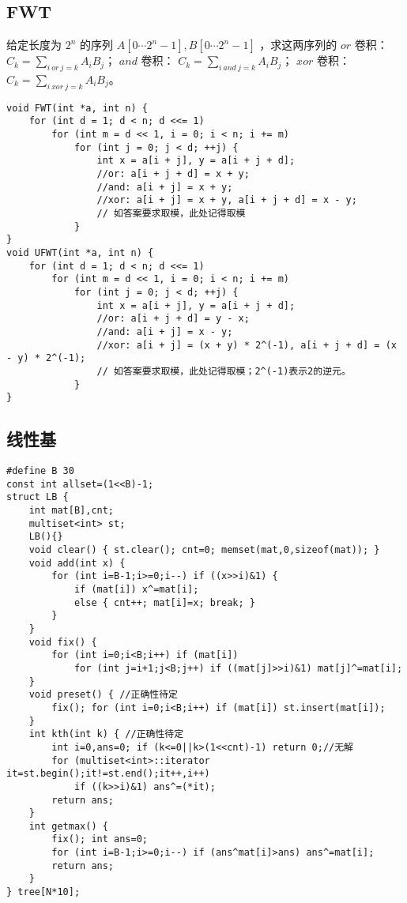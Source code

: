 \documentclass[landscape,a4paper]{article}
\begin{document}
\subsection{FWT}
给定长度为 $2^n$ 的序列 $A[0 \cdots 2^n-1], B[0 \cdots 2^n-1]$ ，求这两序列的
 $or$ 卷积： $C_k = \sum\limits_{i \ or \ j=k} A_iB_j$；
 $and$ 卷积： $C_k = \sum\limits_{i \ and \ j=k} A_iB_j$；
 $xor$ 卷积： $C_k = \sum\limits_{i \ xor \ j=k} A_iB_j$。
\begin{lstlisting}
void FWT(int *a, int n) {
    for (int d = 1; d < n; d <<= 1)
        for (int m = d << 1, i = 0; i < n; i += m)
            for (int j = 0; j < d; ++j) {
                int x = a[i + j], y = a[i + j + d];
                //or: a[i + j + d] = x + y;
                //and: a[i + j] = x + y;
                //xor: a[i + j] = x + y, a[i + j + d] = x - y;
                // 如答案要求取模，此处记得取模
            }
}
void UFWT(int *a, int n) {
    for (int d = 1; d < n; d <<= 1)
        for (int m = d << 1, i = 0; i < n; i += m)
            for (int j = 0; j < d; ++j) {
                int x = a[i + j], y = a[i + j + d];
                //or: a[i + j + d] = y - x;
                //and: a[i + j] = x - y;
                //xor: a[i + j] = (x + y) * 2^(-1), a[i + j + d] = (x - y) * 2^(-1);
                // 如答案要求取模，此处记得取模；2^(-1)表示2的逆元。
            }
}
\end{lstlisting}

\subsection{线性基}

\begin{lstlisting}
#define B 30
const int allset=(1<<B)-1;
struct LB {
	int mat[B],cnt;
	multiset<int> st;
	LB(){}
	void clear() { st.clear(); cnt=0; memset(mat,0,sizeof(mat)); }
	void add(int x) {
		for (int i=B-1;i>=0;i--) if ((x>>i)&1) {
		    if (mat[i]) x^=mat[i]; 
		    else { cnt++; mat[i]=x; break; }
		}
	}
	void fix() {
		for (int i=0;i<B;i++) if (mat[i])
		    for (int j=i+1;j<B;j++) if ((mat[j]>>i)&1) mat[j]^=mat[i];
	}
	void preset() { //正确性待定
		fix(); for (int i=0;i<B;i++) if (mat[i]) st.insert(mat[i]);
	}
	int kth(int k) { //正确性待定
		int i=0,ans=0; if (k<=0||k>(1<<cnt)-1) return 0;//无解
		for (multiset<int>::iterator it=st.begin();it!=st.end();it++,i++)
			if ((k>>i)&1) ans^=(*it);
		return ans;
	}
	int getmax() {
		fix(); int ans=0;
		for (int i=B-1;i>=0;i--) if (ans^mat[i]>ans) ans^=mat[i];
		return ans;
	}
} tree[N*10];
\end{lstlisting}
\end{document}
